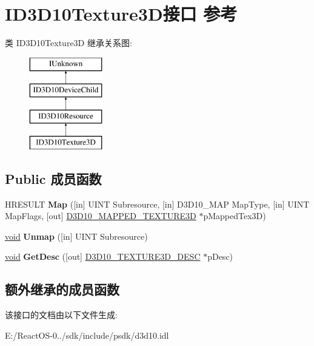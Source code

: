 \hypertarget{interface_i_d3_d10_texture3_d}{}\section{I\+D3\+D10\+Texture3\+D接口 参考}
\label{interface_i_d3_d10_texture3_d}
类 I\+D3\+D10\+Texture3D 继承关系图\+:\begin{figure}[H]
\begin{center}
\leavevmode
\includegraphics[height=4.000000cm]{interface_i_d3_d10_texture3_d}
\end{center}
\end{figure}
\subsection*{Public 成员函数}
\begin{DoxyCompactItemize}
\item 
\mbox{\label{interface_i_d3_d10_texture3_d_a6ff5d90fa1734e3338994c38adbeb8aa}} 
H\+R\+E\+S\+U\+LT {\bfseries Map} (\mbox{[}in\mbox{]} U\+I\+NT Subresource, \mbox{[}in\mbox{]} D3\+D10\+\_\+\+M\+AP Map\+Type, \mbox{[}in\mbox{]} U\+I\+NT Map\+Flags, \mbox{[}out\mbox{]} \hyperlink{struct_d3_d10___m_a_p_p_e_d___t_e_x_t_u_r_e3_d}{D3\+D10\+\_\+\+M\+A\+P\+P\+E\+D\+\_\+\+T\+E\+X\+T\+U\+R\+E3D} $\ast$p\+Mapped\+Tex3D)
\item 
\mbox{\label{interface_i_d3_d10_texture3_d_a455c1dcfa8ef2c41b4eb36e9695b606b}} 
\hyperlink{interfacevoid}{void} {\bfseries Unmap} (\mbox{[}in\mbox{]} U\+I\+NT Subresource)
\item 
\mbox{\label{interface_i_d3_d10_texture3_d_ab85963c01562b5b3352390424cd8f5b2}} 
\hyperlink{interfacevoid}{void} {\bfseries Get\+Desc} (\mbox{[}out\mbox{]} \hyperlink{struct_d3_d10___t_e_x_t_u_r_e3_d___d_e_s_c}{D3\+D10\+\_\+\+T\+E\+X\+T\+U\+R\+E3\+D\+\_\+\+D\+E\+SC} $\ast$p\+Desc)
\end{DoxyCompactItemize}
\subsection*{额外继承的成员函数}


该接口的文档由以下文件生成\+:\begin{DoxyCompactItemize}
\item 
E\+:/\+React\+O\+S-\/0../sdk/include/psdk/d3d10.\+idl\end{DoxyCompactItemize}
